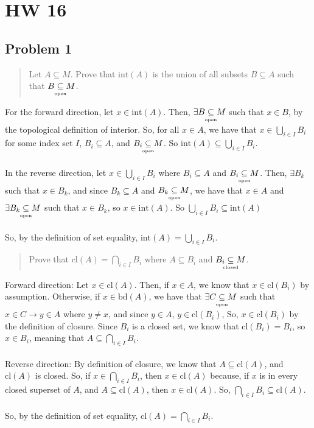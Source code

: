 \documentclass[8pt]{extarticle}
\newcommand{\plain}[1]{\textrm{#1}}
\newcommand{\open}{\underset{\clap{\tiny open}}{\subseteq}}
\newcommand{\closed}{\underset{\clap{\tiny closed}}{\subseteq}}
\begin{document}
{\section*{HW 16}%

\subsection*{Problem 1}%

\begin{quote}
	Let $A\subseteq M$. Prove that $\plain{int}(A)$ is the union of all subsets $B\subseteq A$ such that $B\open M$.
\end{quote}
For the forward direction, let $x\in \plain{int}(A)$. Then, $\exists B\open M$ such that $x\in B$, by the topological definition of interior. So, for all $x\in A$, we have that $x\in \bigcup_{i\in I}B_{i}$ for some index set $I$, $B_{i}\subseteq A$, and $B_{i}\open M$. So $\plain{int}(A)\subseteq \bigcup_{i\in I}B_{i}$.\\
\\
In the reverse direction, let $x\in \bigcup_{i\in I}B_{i}$ where $B_{i}\subseteq A$ and $B_{i}\open M$. Then, $\exists B_{k}$ such that $x\in B_{k}$, and since $B_{k}\subseteq A$ and $B_{k}\open M$, we have that $x\in A$ and $\exists B_{k}\open M$ such that $x\in B_{k}$, so $x\in \plain{int}(A)$. So $\bigcup_{i\in I}B_{i}\subseteq \plain{int}(A)$\\
\\
So, by the definition of set equality, $\plain{int}(A) = \bigcup_{i\in I}B_{i}$.
\begin{quote}
	Prove that $\plain{cl}(A) = \bigcap_{i\in I}B_{i}$ where $A\subseteq B_{i}$ and $B_{i}\closed M$.
\end{quote}
Forward direction: Let $x\in \plain{cl}(A)$. Then, if $x\in A$, we know that $x\in \plain{cl}(B_{i})$ by assumption. Otherwise, if $x\in \plain{bd}(A)$, we have that $\exists C\open M$ such that $x\in C \rightarrow y\in A$ where $y\neq x$, and since $y\in A$, $y\in \plain{cl}(B_{i})$, So, $x\in \plain{cl}(B_{i})$ by the definition of closure. Since $B_{i}$ is a closed set, we know that $\plain{cl}(B_{i}) = B_{i}$, so $x\in B_{i}$, meaning that $A\subseteq \bigcap_{i\in I}B_{i}$.\\
\\
Reverse direction: By definition of closure, we know that $A\subseteq \plain{cl}(A)$, and $\plain{cl}(A)$ is closed. So, if $x\in \bigcap_{i\in I}B_{i}$, then $x\in \plain{cl}(A)$ because, if $x$ is in every closed superset of $A$, and $A\subseteq \plain{cl}(A)$, then $x\in \plain{cl}(A)$. So, $\bigcap_{i\in I}B_{i}\subseteq \plain{cl}(A)$.\\
\\
So, by the definition of set equality, $\textrm{cl}(A) = \bigcap_{i\in I}B_{i}$.
}
\end{document}
